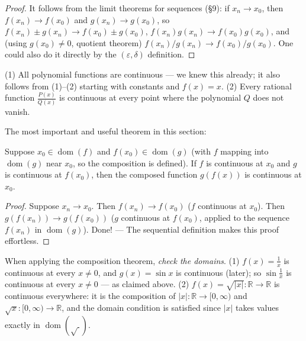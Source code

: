 \documentclass[11pt]{report}
\begin{document}
\begin{proof}
It follows from the limit theorems for sequences (\S 9): if $x_n \to x_0$, then $f(x_n) \to f(x_0)$ and $g(x_n) \to g(x_0)$, so $f(x_n) \pm g(x_n) \to f(x_0) \pm g(x_0)$, $f(x_n)g(x_n) \to f(x_0)g(x_0)$, and (using $g(x_0) \neq 0$, quotient theorem) $f(x_n)/g(x_n) \to f(x_0)/g(x_0)$. One could also do it directly by the $(\varepsilon,\delta)$ definition.
\end{proof}

\begin{exbox}
(1) All polynomial functions are continuous --- we knew this already; it also follows from (1)--(2) starting with constants and $f(x)=x$. (2) Every rational function $\tfrac{P(x)}{Q(x)}$ is continuous at every point where the polynomial $Q$ does not vanish.
\end{exbox}

The most important and useful theorem in this section:

\begin{thmbox}
Suppose $x_0 \in \operatorname{dom}(f)$ and $f(x_0) \in \operatorname{dom}(g)$ (with $f$ mapping into $\operatorname{dom}(g)$ near $x_0$, so the composition is defined). If $f$ is continuous at $x_0$ and $g$ is continuous at $f(x_0)$, then the composed function $g(f(x))$ is continuous at $x_0$.
\end{thmbox}

\begin{proof}
Suppose $x_n \to x_0$. Then $f(x_n) \to f(x_0)$ ($f$ continuous at $x_0$). Then $g(f(x_n)) \to g(f(x_0))$ ($g$ continuous at $f(x_0)$, applied to the sequence $f(x_n)$ in $\operatorname{dom}(g)$). Done! --- The sequential definition makes this proof effortless.
\end{proof}

\begin{exbox}
When applying the composition theorem, \emph{check the domains}. (1) $f(x) = \tfrac1x$ is continuous at every $x \neq 0$, and $g(x) = \sin x$ is continuous (later); so $\sin\tfrac1x$ is continuous at every $x \neq 0$ --- as claimed above. (2) $f(x) = \sqrt{|x|}: \mathbb{R} \to \mathbb{R}$ is continuous everywhere: it is the composition of $|x|: \mathbb{R} \to [0,\infty)$ and $\sqrt{x}: [0,\infty) \to \mathbb{R}$, and the domain condition is satisfied since $|x|$ takes values exactly in $\operatorname{dom}(\sqrt{\ })$.
\end{exbox}
\end{document}
